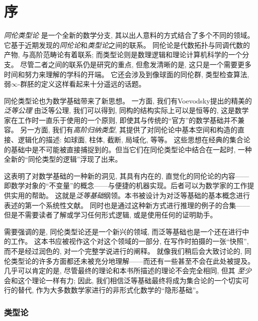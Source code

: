 \chapter*{序}
\setcounter{page}{1}


\emph{同伦类型论} 是一个全新的数学分支, 其以出人意料的方式结合了多个不同的领域。它基于近期发现的\emph{同伦论}和\emph{类型论}之间的联系。
同伦论是代数拓扑与同调代数的产物, 与高阶范畴论有着联系; 而类型论则是数理逻辑和理论计算机科学的一个分支。
尽管二者之间的联系仍是研究的重点, 但愈发清晰的是, 这只是一个需要更多时间和努力来理解的学科的开端。
它还会涉及到像球面的同伦群, 类型检查算法, 弱$\infty$-群胚的定义这样看起来十分遥远的话题。

同伦类型论也为数学基础带来了新思想。
%
一方面, 我们有Voevodsky提出的精美的\emph{泛等公理}
%
由泛等公理, 我们可以得到, 同构的结构实际上可以是恒等的, 这是数学家在工作时一直乐于使用的一个原则, 即使其与传统的``官方''的数学基础并不兼容。
另一方面, 我们有\emph{高阶归纳类型}, 其提供了对同伦论中基本空间和构造的直接、逻辑化的描述: 如球面, 柱体, 截断, 局域化, 等等。
这些思想在经典的集合论的基础中是不可能被直接捕捉到的。但当它们在同伦类型论中结合在一起时, 一种全新的``同伦类型的逻辑''浮现了出来。
%

这表明了对数学基础的一种新的洞见, 其具有内在的, 直觉化的同伦论的内容——
即数学对象的``不变量''的概念——与便捷的机器实现。后者可以为数学家的工作提供实用的帮助。
这就是\emph{泛等基础}纲领。本书被设计为对泛等基础的基本概念进行表述的第一个系统性文献。
同时也是通过这种新方式进行推理的例子的合集——但是不需要读者了解或学习任何形式逻辑, 或是使用任何的证明助手。

\OPTwidow

需要强调的是, 同伦类型论还是一个新兴的领域, 而泛等基础也是一个还在进行中的工作。
这本书应被视作这个对这个领域的一部分, 在写作时拍摄的一张``快照'', 而不是经过润色的, 对一个完整学说进行的阐释。
就像我们稍后会大致讨论的, 同伦类型论的许多方面都还未被充分地理解——而还有一些甚至不会在此处被提及。
几乎可以肯定的是, 尽管最终的理论和本书所描述的理论不会完全相同, 但其 \emph{至少} 会和这个理论一样有力; 因此, 
我们相信泛等基础最终将成为集合论的一个切实可行的替代, 作为大多数数学家进行的非形式化数学的``隐形基础''。

\subsection*{类型论}


